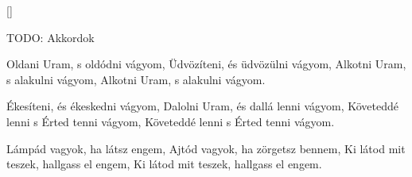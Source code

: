 []

  \beginverse*
    TODO: Akkordok
  \endverse

  \beginverse\memorize
    Oldani Uram, s oldódni vágyom,
    Üdvözíteni, és üdvözülni vágyom,
    Alkotni Uram, s alakulni vágyom,
    Alkotni Uram, s alakulni vágyom.
  \endverse

  \beginverse
    Ékesíteni, és ékeskedni vágyom,
    Dalolni Uram, és dallá lenni vágyom,
    Követeddé lenni s Érted tenni vágyom,
    Követeddé lenni s Érted tenni vágyom.
  \endverse

  \beginverse
    Lámpád vagyok, ha látsz engem,
    Ajtód vagyok, ha zörgetsz bennem,
    Ki látod mit teszek, hallgass el engem,
    Ki látod mit teszek, hallgass el engem.
  \endverse

\endsong
